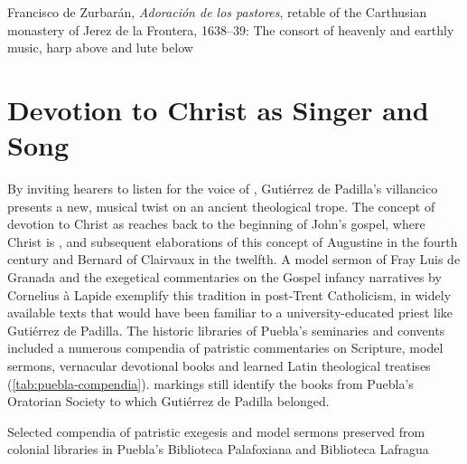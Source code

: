 {Francisco de Zurbarán, \emph{Adoración de los pastores}, retable of the
Carthusian monastery of Jerez de la Frontera, 1638--39: The consort of heavenly
and earthly music, harp above and lute below}

\section{Devotion to Christ as Singer and Song}

By inviting hearers to listen for the voice of ,
Gutiérrez de Padilla's villancico presents a new, musical twist on an ancient
theological trope.
The concept of devotion to Christ as  reaches back to
the beginning of John's gospel, where Christ is ,
and subsequent elaborations of this concept of Augustine in the fourth century
and Bernard of Clairvaux in the twelfth.
A model sermon of Fray Luis de Granada and the exegetical commentaries on the
Gospel infancy narratives by Cornelius à Lapide exemplify this tradition in
post-Trent Catholicism, in widely available texts that would have been familiar
to a university-educated priest like Gutiérrez de Padilla.
The historic libraries of Puebla's seminaries and convents included a numerous
compendia of patristic commentaries on Scripture, model sermons, vernacular
devotional books and learned Latin theological treatises
(\cref{tab:puebla-compendia}).
 markings still identify the books from Puebla's 
Oratorian Society to which Gutiérrez de Padilla belonged.%
    \Autocite{Mauleon:PadillaCivil}

{Selected compendia of patristic exegesis and model sermons preserved from
colonial libraries in Puebla's Biblioteca Palafoxiana and Biblioteca Lafragua}

